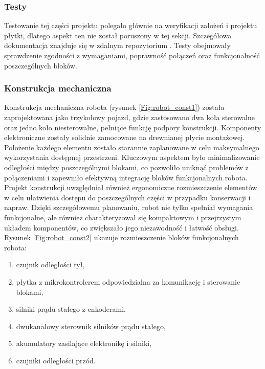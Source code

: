 \documentclass[12pt,twoside]{article}
\begin{document}
\subsubsection{Testy}
Testowanie tej części projektu polegało głównie na weryfikacji założeń i projektu płytki, dlatego aspekt ten nie został poruszony w tej sekcji. Szczegółowa dokumentacja znajduje się w zdalnym repozytorium \cite{repo}. Testy obejmowały sprawdzenie zgodności z wymaganiami, poprawność połączeń oraz funkcjonalność poszczególnych bloków.

\subsubsection{Konstrukcja mechaniczna}
Konstrukcja mechaniczna robota (rysunek \ref{Fig:robot_const1}) została zaprojektowana jako trzykołowy pojazd, gdzie zastosowano dwa koła sterowalne oraz jedno koło niesterowalne, pełniące funkcję podpory konstrukcji. Komponenty elektroniczne zostały solidnie zamocowane na drewnianej płycie montażowej. Położenie każdego elementu zostało starannie zaplanowane w celu maksymalnego wykorzystania dostępnej przestrzeni. Kluczowym aspektem było minimalizowanie odległości między poszczególnymi blokami, co pozwoliło uniknąć problemów z połączeniami i zapewniło efektywną integrację bloków funkcjonalnych robota. Projekt konstrukcji uwzględniał również ergonomiczne rozmieszczenie elementów w celu ułatwienia dostępu do poszczególnych części w przypadku konserwacji i napraw. Dzięki szczegółowemu planowaniu, robot nie tylko spełniał wymagania funkcjonalne, ale również charakteryzował się kompaktowym i przejrzystym układem komponentów, co zwiększało jego niezawodność i łatwość obsługi. Rysunek \ref{Fig:robot_const2} ukazuje rozmieszczenie bloków funkcjonalnych robota:
\begin{enumerate}[label=\alph*), leftmargin=1.25cm]
	\item czujnik odległości tył,
	\item płytka z mikrokontrolerem odpowiedzialna za komunikację i sterowanie blokami,
	\item silniki prądu stałego z enkoderami,
	\item dwukanałowy sterownik silników prądu stałego,
	\item akumulatory zasilające elektronikę i silniki,
	\item czujniki odległości przód.
\end{enumerate}
\end{document}
